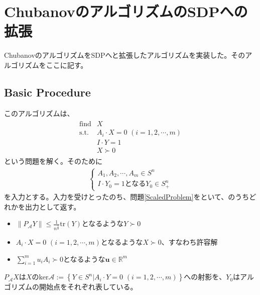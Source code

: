 \section{ChubanovのアルゴリズムのSDPへの拡張}
ChubanovのアルゴリズムをSDPへと拡張したアルゴリズムを実装した。そのアルゴリズムをここに記す。

\subsection{Basic Procedure}
このアルゴリズムは、
\begin{align*} \label{ScaledProblem}
  \begin{array}{ll}
    \text{find} & X \\
    \text{s.t.} & A_i \cdot X = 0 \,\, (i = 1, 2, \cdots, m) \\
                & I \cdot Y = 1 \\
                & X \succ 0
  \end{array}
\end{align*}
という問題を解く。そのために
\begin{align*}
  \left\{
    \begin{array}{l}
      A_1, A_2, \cdots, A_m \in S^n \\
      I \cdot Y_0 = 1\text{となる}Y_0 \in S_+^n
    \end{array}
  \right.
\end{align*}
を入力とする。入力を受けとったのち、問題\ref{ScaledProblem}をといて、のうちどれかを出力として返す。
\begin{itemize}
  \item $\displaystyle{\|P_\mathcal{A} Y\| \leq \frac{1}{n^{\frac{3}{2}}} \mathrm{tr}(Y)}$となるような$Y \succ 0$
  \item $A_i \cdot X = 0 \,\, (i = 1, 2, \cdots, m)$となるような$X \succ 0$、すなわち許容解
  \item $\displaystyle{\sum_{i = 1}^m u_i A_i \succ 0}$となるような$\mathbf{u} \in \mathbb{R}^m$
\end{itemize}
$P_\mathcal{A} X$は$X$の$\mathrm{ker}\mathcal{A} := \left\{Y \in S^n | A_i \cdot Y = 0 \,\, (i = 1, 2, \cdots, m)\right\}$への射影を、$Y_0$はアルゴリズムの開始点をそれぞれ表している。

